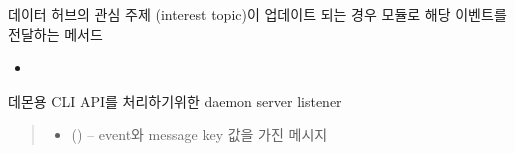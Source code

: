 \documentclass[a4paper,10pt,english]{sphinxmanual}
\begin{document}
\begin{fulllineitems}
\begin{fulllineitems}
\label{\detokenize{_DHDaemon:DHDaemon._dhSearchUpdateInterestTopic}}
\pysigstartsignatures
{}
\pysigstopsignatures
\sphinxAtStartPar
데이터 허브의 관심 주제 (interest topic)이 업데이트 되는 경우  모듈로 해당 이벤트를 전달하는 메서드


\nopagebreak

\begin{itemize}
\item {} 
\sphinxAtStartPar
{\hyperref[\detokenize{_DHSearch:DHSearch._dhDaemonListener}]{}}

\end{itemize}



\end{fulllineitems}


\begin{fulllineitems}
\label{\detokenize{_DHDaemon:DHDaemon._dmServerListener}}
\pysigstartsignatures
{}
\pysigstopsignatures
\sphinxAtStartPar
데몬용 CLI API를 처리하기위한 daemon server listener
\begin{quote}\begin{description}
\begin{itemize}
\item {} 
\sphinxAtStartPar
{} () – event와 message key 값을 가진 메시지

\end{itemize}

\end{description}\end{quote}

\end{fulllineitems}



\end{fulllineitems}
\end{document}
